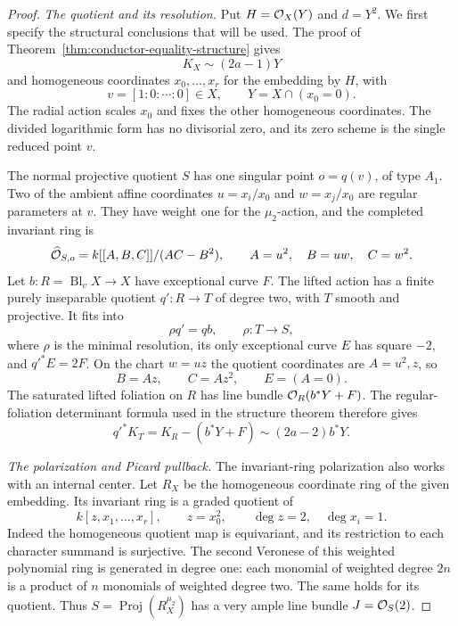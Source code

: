 \begin{proof}
\emph{The quotient and its resolution.}
Put $H=\mathcal O_X(Y)$ and $d=Y^2$. We first specify the structural
conclusions that will be used. The proof of
Theorem~\ref{thm:conductor-equality-structure} gives
\[
 K_X\sim(2a-1)Y
\]
and homogeneous coordinates $x_0,\ldots,x_r$ for the embedding by
$H$, with
\[
 v=[1:0:\cdots:0]\in X,
 \qquad Y=X\cap(x_0=0).
\]
The radial action scales $x_0$ and fixes the other homogeneous
coordinates. The divided logarithmic form has no divisorial zero,
and its zero scheme is the single reduced point $v$.

The normal projective quotient $S$ has one singular point
$o=q(v)$, of type $A_1$. Two of the ambient affine coordinates
$u=x_i/x_0$ and $w=x_j/x_0$ are regular parameters at $v$. They
have weight one for the $\mu_2$-action, and the completed invariant
ring is
\begin{equation}\label{eq:internal-cartier-invariant-ring}
 \widehat{\mathcal O}_{S,o}
 =k[[A,B,C]]/(AC-B^2),
 \qquad A=u^2,\quad B=uw,\quad C=w^2.
\end{equation}
Let $b:R=\operatorname{Bl}_vX\to X$ have exceptional curve $F$.
The lifted action has a finite purely inseparable quotient
$q':R\to T$ of degree two, with $T$ smooth and projective. It fits
into
\[
 \rho q'=qb,\qquad \rho:T\longrightarrow S,
\]
where $\rho$ is the minimal resolution, its only exceptional curve
$E$ has square $-2$, and $q'^*E=2F$. On the chart $w=uz$ the
quotient coordinates are $A=u^2,z$, so
\[
 B=Az,\qquad C=Az^2,\qquad E=(A=0).
\]
The saturated lifted foliation on $R$ has line bundle
$\mathcal O_R(b^*Y+F)$. The regular-foliation determinant formula used in
the structure theorem therefore gives
\begin{equation}\label{eq:internal-cartier-canonical-pullback}
 q'^*K_T=K_R-(b^*Y+F)\sim(2a-2)b^*Y.
\end{equation}

\emph{The polarization and Picard pullback.}
The invariant-ring polarization also works with an internal center.
Let $R_X$ be the homogeneous coordinate ring of the given embedding.
Its invariant ring is a graded quotient of
\[
 k[z,x_1,\ldots,x_r],\qquad z=x_0^2,
 \qquad \deg z=2,\quad\deg x_i=1.
\]
Indeed the homogeneous quotient map is equivariant, and its
restriction to each character summand is surjective. The second
Veronese of this weighted polynomial ring is generated in degree
one: each monomial of weighted degree $2n$ is a product of $n$
monomials of weighted degree two. The same holds for its quotient.
Thus $S=\operatorname{Proj}(R_X^{\mu_2})$ has a very ample line
bundle $J=\mathcal O_S(2)$.


\end{proof}
